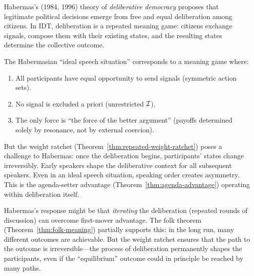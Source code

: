 \begin{interpretation}
\label{interp:deliberative-democracy}
Habermas's (1984, 1996) theory of \emph{deliberative democracy} proposes that
legitimate political decisions emerge from free and equal deliberation among
citizens.  In IDT, deliberation is a repeated meaning game: citizens exchange
signals, compose them with their existing states, and the resulting states
determine the collective outcome.

The Habermasian ``ideal speech situation'' corresponds to a meaning game where:
\begin{enumerate}
  \item All participants have equal opportunity to send signals (symmetric
        action sets).
  \item No signal is excluded a priori (unrestricted $\mathcal{I}$).
  \item The only force is ``the force of the better argument'' (payoffs
        determined solely by resonance, not by external coercion).
\end{enumerate}

But the weight ratchet (Theorem~\ref{thm:repeated-weight-ratchet}) poses a challenge
to Habermas: once the deliberation begins, participants' states change
irreversibly.  Early speakers shape the deliberative context for all
subsequent speakers.  Even in an ideal speech situation, speaking order
creates asymmetry.  This is the agenda-setter advantage
(Theorem~\ref{thm:agenda-advantage}) operating within deliberation itself.

Habermas's response might be that \emph{iterating} the deliberation
(repeated rounds of discussion) can overcome first-mover advantage.  The
folk theorem (Theorem~\ref{thm:folk-meaning}) partially supports this: in
the long run, many different outcomes are achievable.  But the weight
ratchet ensures that the path to the outcome is irreversible---the
process of deliberation permanently shapes the participants, even if the
``equilibrium'' outcome could in principle be reached by many paths.
\end{interpretation}


